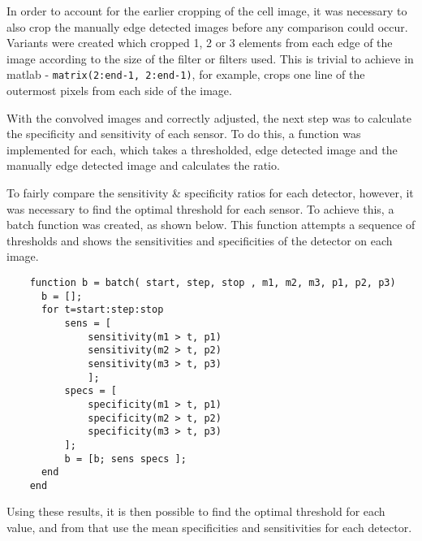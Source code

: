 \documentclass[12pt]{article}
\begin{document}
  In order to account for the earlier cropping of the cell image, it was necessary to also crop the manually edge detected images before any comparison could occur. Variants were created which cropped 1, 2 or 3 elements from each edge of the image according to the size of the filter or filters used. This is trivial to achieve in matlab - \texttt{matrix(2:end-1, 2:end-1)}, for example, crops one line of the outermost pixels from each side of the image.

  With the convolved images and correctly adjusted, the next step was to calculate the specificity and sensitivity of each sensor. To do this, a function was implemented for each, which takes a thresholded, edge detected image and the manually edge detected image and calculates the ratio.

  To fairly compare the sensitivity \& specificity ratios for each detector, however, it was necessary to find the optimal threshold for each sensor. To achieve this, a batch function was created, as shown below. This function attempts a sequence of thresholds and shows the sensitivities and specificities of the detector on each image.

  \small\begin{verbatim}
    function b = batch( start, step, stop , m1, m2, m3, p1, p2, p3)
      b = [];
      for t=start:step:stop
          sens = [
              sensitivity(m1 > t, p1)
              sensitivity(m2 > t, p2)
              sensitivity(m3 > t, p3)
              ];
          specs = [
              specificity(m1 > t, p1)
              specificity(m2 > t, p2)
              specificity(m3 > t, p3)
          ];
          b = [b; sens specs ];
      end
    end
  \end{verbatim}

  Using these results, it is then possible to find the optimal threshold for each value, and from that use the mean specificities and sensitivities for each detector.
\end{document}
